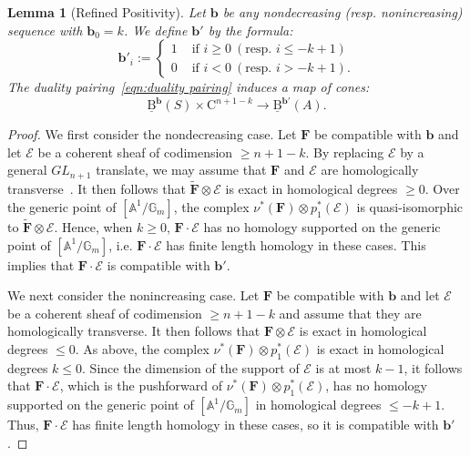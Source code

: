 \documentclass[12pt]{amsart}
\newtheorem{lemma}{Lemma}[section]
\theoremstyle{definition}
\theoremstyle{remark}
\renewcommand{\AA}{\mathbb{A}}
\newcommand{\GG}{\mathbb{G}}
\newcommand{\bb}{\mathbf{b}}
\newcommand{\cE}{\mathcal{E}}
\newcommand{\FF}{\mathbf{F}}
\newcommand{\GL}{{GL}}
\newcommand{\CQ}{\mathrm{C}}
\newcommand{\BBQ}{\underline{\mathrm{B}}}
\begin{document}
\begin{lemma}[Refined Positivity]\label{lem:refined positivity}
Let $\bb$ be any nondecreasing (resp. nonincreasing) sequence with $\bb_0=k$.   We define $\bb'$ by the formula:
\[
\bb'_i:=\begin{cases}
1&\text{ if } i\geq 0 \ (\text{resp. } i\leq -k+1)\\
0&\text{ if } i<0  \ (\text{resp. } i> -k+1).
\end{cases}
\]
The duality pairing~\eqref{eqn:duality pairing} induces a map of cones:
\[
\BBQ^{\bb}(S)\times \CQ^{n+1-k}\to \BBQ^{\bb'}(A).
\]
\end{lemma}
\begin{proof}
We first consider the nondecreasing case.  Let $\FF$ be compatible with $\bb$ and let $\cE$ be a coherent sheaf of codimension $\geq n+1-k$.  By replacing $\cE$ by a general $\GL_{n+1}$ translate, we may assume that $\FF$ and $\cE$ are homologically transverse~\cite{miller-speyer}.  It then follows that $\widetilde{\FF}\otimes \cE$ is exact in homological degrees $\geq 0$.  Over the generic point of $[\AA^1/\GG_m]$, the complex $\nu^*(\FF)\otimes p_1^*(\cE)$ is quasi-isomorphic to $\widetilde{\FF}\otimes \cE$.  Hence, when $k\geq 0$, $\FF\cdot \cE$ has no homology supported on the generic point of $[\AA^1/\GG_m]$, i.e. $\FF\cdot \cE$ has finite length homology in these cases.  This implies that $\FF\cdot \cE$ is compatible with $\bb'$.

We next consider the nonincreasing case.  Let $\FF$ be compatible with $\bb$ and let $\cE$ be a coherent sheaf of codimension $\geq n+1-k$ and assume that they are homologically transverse.  It then follows that $\FF\otimes \cE$ is exact in homological degrees $\leq 0$.
As above, the complex $\nu^*(\FF)\otimes p_1^*(\cE)$ is exact in homological degrees $k\leq 0$.  Since the dimension of the support of $\cE$ is at most $k-1$, it follows that $\FF\cdot \cE$, which is the pushforward of $\nu^*(\FF)\otimes p_1^*(\cE)$, has no homology supported on the generic point of $[\AA^1/\GG_m]$ in homological degrees $\leq -k+1$.  Thus, $\FF\cdot \cE$ has finite length homology in these cases, so it is compatible with $\bb'$.
\end{proof}
\end{document}
